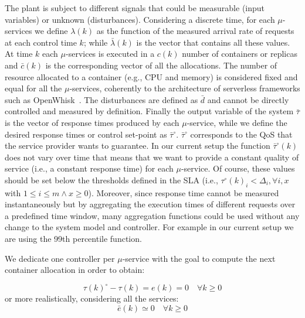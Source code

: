 The plant is subject to different signals that could be measurable (input variables) or unknown (disturbances). Considering a discrete time, for each $\mu$-services we define $\lambda(k)$ as the function of the measured arrival rate of requests at each control time $k$; while $\bar{\lambda}(k)$ is the vector that contains all these values. At time $k$ each $\mu$-services is executed in a $c(k)$ number of containers or replicas and $\bar{c}(k)$ is the corresponding vector of all the allocations. The number of resource allocated to a container (e.g., CPU and memory) is considered fixed and equal for all the $\mu$-services, coherently to the architecture of serverless frameworks such as OpenWhisk~\cite{OpenWhisk}. The disturbances are defined as $\bar{d}$ and cannot be directly controlled and measured by definition.  Finally the output variable of the system $\bar{\tau}$ is the vector of response times produced by each $\mu$-service, while we define the desired response times or control set-point as $\bar{\tau}^\circ$. $\bar{\tau}^\circ$ corresponds to the QoS that the service provider wants to guarantee. In our current setup the function $\bar{\tau}^\circ(k)$ does not vary over time that means that we want to provide a constant quality of service (i.e., a constant response time) for each  $\mu$-service. Of course, these values should be set below the thresholds defined in the SLA (i.e., ${\tau}^\circ(k)_i <  \Delta_i, \forall i, x$ with $ 1 \le i \le m \wedge x \ge 0$). Moreover, since response time cannot be measured instantaneously but by aggregating the execution times of different requests over a predefined time window, many aggregation functions could be used without any change to the system model and controller. For example in our current setup we are using the 99th percentile function. 

 We dedicate one controller per $\mu$-service with the goal to compute the next container allocation in order to obtain:

\begin{equation}
	\tau(k)^\circ - \tau(k) = e(k) = 0\quad \forall{k} \ge 0
\end{equation}
or more realistically, considering all the services:
\begin{equation}
\bar{e}(k) \simeq 0 \quad \forall{k} \ge 0
\end{equation}

